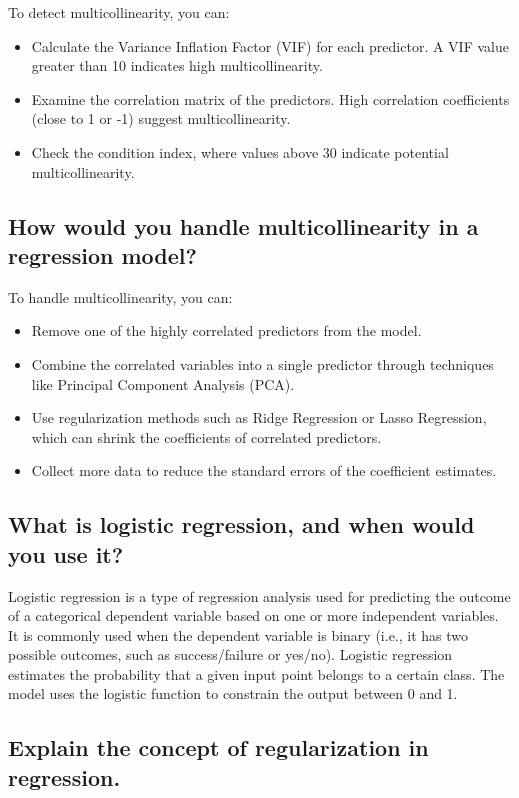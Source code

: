 \documentclass[12pt]{article}
\begin{document}
To detect multicollinearity, you can:
\begin{itemize}
    \item Calculate the Variance Inflation Factor (VIF) for each predictor. A VIF value greater than 10 indicates high multicollinearity.
    \item Examine the correlation matrix of the predictors. High correlation coefficients (close to 1 or -1) suggest multicollinearity.
    \item Check the condition index, where values above 30 indicate potential multicollinearity.
\end{itemize}

\subsection{How would you handle multicollinearity in a regression model?}

To handle multicollinearity, you can:
\begin{itemize}
    \item Remove one of the highly correlated predictors from the model.
    \item Combine the correlated variables into a single predictor through techniques like Principal Component Analysis (PCA).
    \item Use regularization methods such as Ridge Regression or Lasso Regression, which can shrink the coefficients of correlated predictors.
    \item Collect more data to reduce the standard errors of the coefficient estimates.
\end{itemize}

\subsection{What is logistic regression, and when would you use it?}

Logistic regression is a type of regression analysis used for predicting the outcome of a categorical dependent variable based on one or more independent variables. It is commonly used when the dependent variable is binary (i.e., it has two possible outcomes, such as success/failure or yes/no). Logistic regression estimates the probability that a given input point belongs to a certain class. The model uses the logistic function to constrain the output between 0 and 1.

\subsection{Explain the concept of regularization in regression.}
\end{document}
